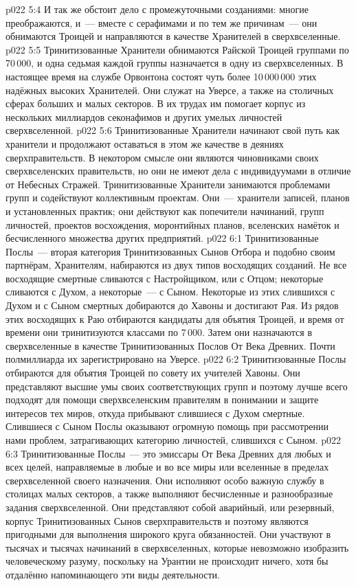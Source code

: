 \vs p022 5:4 И так же обстоит дело с промежуточными созданиями: многие преображаются, и~--- вместе с серафимами и по тем же причинам~--- они обнимаются Троицей и направляются в качестве Хранителей в сверхвселенные.
\vs p022 5:5 Тринитизованные Хранители обнимаются Райской Троицей группами по 70\,000, и одна седьмая каждой группы назначается в одну из сверхвселенных. В настоящее время на службе Орвонтона состоят чуть более 10\,000\,000 этих надёжных высоких Хранителей. Они служат на Уверсе, а также на столичных сферах больших и малых секторов. В их трудах им помогает корпус из нескольких миллиардов секонафимов и других умелых личностей сверхвселенной.
\vs p022 5:6 Тринитизованные Хранители начинают свой путь как хранители и продолжают оставаться в этом же качестве в деяниях сверхправительств. В некотором смысле они являются чиновниками своих сверхвселенских правительств, но они не имеют дела с индивидуумами в отличие от Небесных Стражей. Тринитизованные Хранители занимаются проблемами групп и содействуют коллективным проектам. Они~--- хранители записей, планов и установленных практик; они действуют как попечители начинаний, групп личностей, проектов восхождения, моронтийных планов, вселенских намёток и бесчисленного множества других предприятий.
\vs p022 6:1 Тринитизованные Послы~--- вторая категория Тринитизованных Сынов Отбора и подобно своим партнёрам, Хранителям, набираются из двух типов восходящих созданий. Не все восходящие смертные сливаются с Настройщиком, или с Отцом; некоторые сливаются с Духом, а некоторые~--- с Сыном. Некоторые из этих слившихся с Духом и с Сыном смертных добираются до Хавоны и достигают Рая. Из рядов этих восходящих к Раю отбираются кандидаты для объятия Троицей, и время от времени они тринитизуются классами по 7\,000. Затем они назначаются в сверхвселенные в качестве Тринитизованных Послов От Века Древних. Почти полмиллиарда их зарегистрировано на Уверсе.
\vs p022 6:2 Тринитизованные Послы отбираются для объятия Троицей по совету их учителей Хавоны. Они представляют высшие умы своих соответствующих групп и поэтому лучше всего подходят для помощи сверхвселенским правителям в понимании и защите интересов тех миров, откуда прибывают слившиеся с Духом смертные. Слившиеся с Сыном Послы оказывают огромную помощь при рассмотрении нами проблем, затрагивающих категорию личностей, слившихся с Сыном.
\vs p022 6:3 Тринитизованные Послы~--- это эмиссары От Века Древних для любых и всех целей, направляемые в любые и во все миры или вселенные в пределах сверхвселенной своего назначения. Они исполняют особо важную службу в столицах малых секторов, а также выполняют бесчисленные и разнообразные задания сверхвселенной. Они представляют собой аварийный, или резервный, корпус Тринитизованных Сынов сверхправительств и поэтому являются пригодными для выполнения широкого круга обязанностей. Они участвуют в тысячах и тысячах начинаний в сверхвселенных, которые невозможно изобразить человеческому разуму, поскольку на Урантии не происходит ничего, хотя бы отдалённо напоминающего эти виды деятельности.
